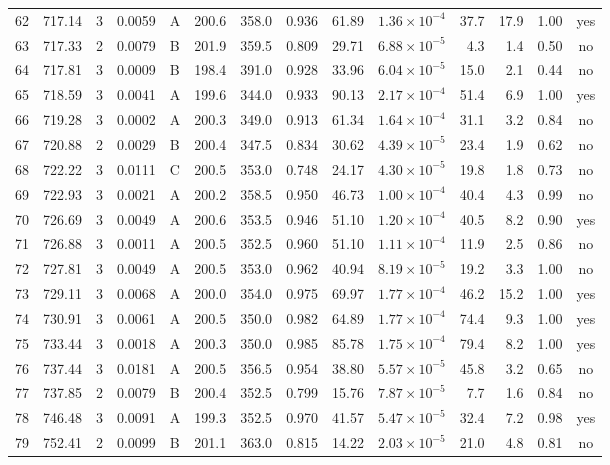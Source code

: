 \begin{landscape}
\begin{longtable}{rrrrlrrrrrrrrc}
62 & 717.14 & 3 & 0.0059 & A & 200.6 & 358.0 & 0.936 & 61.89 & $1.36\times10^{-4}$ & 37.7 & 17.9 & 1.00 & yes \\
63 & 717.33 & 2 & 0.0079 & B & 201.9 & 359.5 & 0.809 & 29.71 & $6.88\times10^{-5}$ & 4.3 & 1.4 & 0.50 & no \\
64 & 717.81 & 3 & 0.0009 & B & 198.4 & 391.0 & 0.928 & 33.96 & $6.04\times10^{-5}$ & 15.0 & 2.1 & 0.44 & no \\
65 & 718.59 & 3 & 0.0041 & A & 199.6 & 344.0 & 0.933 & 90.13 & $2.17\times10^{-4}$ & 51.4 & 6.9 & 1.00 & yes \\
66 & 719.28 & 3 & 0.0002 & A & 200.3 & 349.0 & 0.913 & 61.34 & $1.64\times10^{-4}$ & 31.1 & 3.2 & 0.84 & no \\
67 & 720.88 & 2 & 0.0029 & B & 200.4 & 347.5 & 0.834 & 30.62 & $4.39\times10^{-5}$ & 23.4 & 1.9 & 0.62 & no \\
68 & 722.22 & 3 & 0.0111 & C & 200.5 & 353.0 & 0.748 & 24.17 & $4.30\times10^{-5}$ & 19.8 & 1.8 & 0.73 & no \\
69 & 722.93 & 3 & 0.0021 & A & 200.2 & 358.5 & 0.950 & 46.73 & $1.00\times10^{-4}$ & 40.4 & 4.3 & 0.99 & no \\
70 & 726.69 & 3 & 0.0049 & A & 200.6 & 353.5 & 0.946 & 51.10 & $1.20\times10^{-4}$ & 40.5 & 8.2 & 0.90 & yes \\
71 & 726.88 & 3 & 0.0011 & A & 200.5 & 352.5 & 0.960 & 51.10 & $1.11\times10^{-4}$ & 11.9 & 2.5 & 0.86 & no \\
72 & 727.81 & 3 & 0.0049 & A & 200.5 & 353.0 & 0.962 & 40.94 & $8.19\times10^{-5}$ & 19.2 & 3.3 & 1.00 & no \\
73 & 729.11 & 3 & 0.0068 & A & 200.0 & 354.0 & 0.975 & 69.97 & $1.77\times10^{-4}$ & 46.2 & 15.2 & 1.00 & yes \\
74 & 730.91 & 3 & 0.0061 & A & 200.5 & 350.0 & 0.982 & 64.89 & $1.77\times10^{-4}$ & 74.4 & 9.3 & 1.00 & yes \\
75 & 733.44 & 3 & 0.0018 & A & 200.3 & 350.0 & 0.985 & 85.78 & $1.75\times10^{-4}$ & 79.4 & 8.2 & 1.00 & yes \\
76 & 737.44 & 3 & 0.0181 & A & 200.5 & 356.5 & 0.954 & 38.80 & $5.57\times10^{-5}$ & 45.8 & 3.2 & 0.65 & no \\
77 & 737.85 & 2 & 0.0079 & B & 200.4 & 352.5 & 0.799 & 15.76 & $7.87\times10^{-5}$ & 7.7 & 1.6 & 0.84 & no \\
78 & 746.48 & 3 & 0.0091 & A & 199.3 & 352.5 & 0.970 & 41.57 & $5.47\times10^{-5}$ & 32.4 & 7.2 & 0.98 & yes \\
79 & 752.41 & 2 & 0.0099 & B & 201.1 & 363.0 & 0.815 & 14.22 & $2.03\times10^{-5}$ & 21.0 & 4.8 & 0.81 & no \\

\end{longtable}
\end{landscape}
